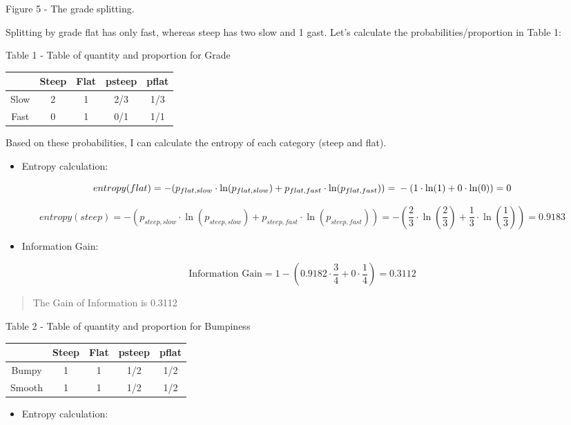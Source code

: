 \documentclass[]{book}
\providecommand{\tightlist}{%
  \setlength{\itemsep}{0pt}\setlength{\parskip}{0pt}}
\begin{document}
Figure 5 - The grade splitting.

Splitting by grade flat has only fast, whereas steep has two slow and 1
gast. Let's calculate the probabilities/proportion in Table 1:

Table 1 - Table of quantity and proportion for Grade

\begin{longtable}[]{@{}ccccc@{}}
\toprule
& Steep & Flat & psteep & pflat\tabularnewline
\midrule
\endhead
Slow & 2 & 1 & 2/3 & 1/3\tabularnewline
Fast & 0 & 1 & 0/1 & 1/1\tabularnewline
\bottomrule
\end{longtable}

Based on these probabilities, I can calculate the entropy of each
category (steep and flat).

\begin{itemize}
\tightlist
\item
  Entropy calculation:
\end{itemize}

\[entropy(flat) = -(p_{flat,slow} \cdot \ln(p_{flat,slow}) + p_{flat,fast} \cdot \ln(p_{flat,fast})) = \\ -(1 \cdot \ln(1) + 0 \cdot \ln(0)) = 0 \]

\[entropy(steep) = -(p_{steep,slow} \cdot \ln(p_{steep,slow}) + p_{steep,fast} \cdot \ln(p_{steep,fast})) = -(\frac{2}{3} \cdot \ln(\frac{2}{3}) + \frac{1}{3} \cdot \ln(\frac{1}{3})) = 0.9183\]

\begin{itemize}
\tightlist
\item
  Information Gain:
\end{itemize}

\[\text{Information Gain} = 1 - (0.9182 \cdot \frac{3}{4} + 0 \cdot \frac{1}{4}) = 0.3112 \]

\begin{quote}
The Gain of Information is 0.3112
\end{quote}

Table 2 - Table of quantity and proportion for Bumpiness

\begin{longtable}[]{@{}ccccc@{}}
\toprule
& Steep & Flat & psteep & pflat\tabularnewline
\midrule
\endhead
Bumpy & 1 & 1 & 1/2 & 1/2\tabularnewline
Smooth & 1 & 1 & 1/2 & 1/2\tabularnewline
\bottomrule
\end{longtable}

\begin{itemize}
\tightlist
\item
  Entropy calculation:
\end{itemize}
\end{document}
